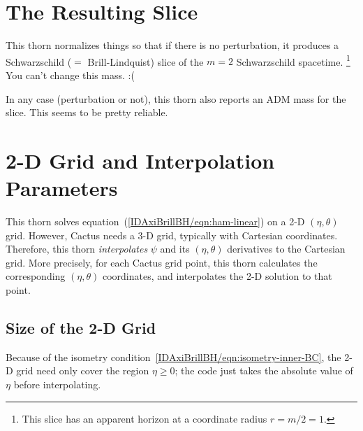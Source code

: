 \documentclass{article}
\begin{document}

\section{The Resulting Slice}

This thorn normalizes things so that if there is no perturbation,
it produces a Schwarzschild ($=$ Brill-Lindquist) slice of the $m=2$
Schwarzschild spacetime.%
\footnote{%
	 This slice has an apparent horizon at a
	 coordinate radius $r=m/2=1$.
	 }%
{}  You can't change this mass. :(

In any case (perturbation or not), this thorn also reports an ADM mass
for the slice.  This seems to be pretty reliable.


\section{2-D Grid and Interpolation Parameters}

This thorn solves equation~(\ref{IDAxiBrillBH/eqn:ham-linear}) on a 2-D
$(\eta,\theta)$ grid.  However, Cactus needs a 3-D grid, typically with
Cartesian coordinates.  Therefore, this thorn \emph{interpolates} $\psi$
and its $(\eta,\theta)$ derivatives to the Cartesian grid.  More precisely,
for each Cactus grid point, this thorn calculates the corresponding
$(\eta,\theta)$ coordinates, and interpolates the 2-D solution to
that point.


\subsection{Size of the 2-D Grid}

Because of the isometry condition~\eqref{IDAxiBrillBH/eqn:isometry-inner-BC},
the 2-D grid need only cover the region $\eta \ge 0$; the code just
takes the absolute value of $\eta$ before interpolating.
\end{document}

